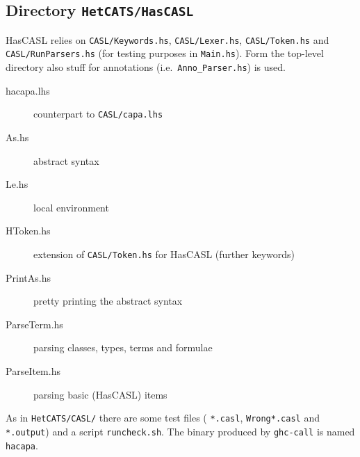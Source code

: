 \documentclass{article}
\begin{document}
\subsection{Directory \texttt{HetCATS/HasCASL}}

HasCASL relies on \texttt{CASL/Keywords.hs}, \texttt{CASL/Lexer.hs},
\texttt{CASL/Token.hs} and \texttt{CASL/RunParsers.hs} (for testing
purposes in \texttt{Main.hs}). Form the top-level directory also stuff
for annotations (i.e.\ \texttt{Anno\_Parser.hs}) is used.

\begin{description}
\item[hacapa.lhs] counterpart to \texttt{CASL/capa.lhs} 
\item[As.hs] abstract syntax
\item[Le.hs] local environment
\item[HToken.hs] extension of \texttt{CASL/Token.hs} for HasCASL
  (further keywords)
\item[PrintAs.hs] pretty printing the abstract syntax
\item[ParseTerm.hs] parsing classes, types, terms and formulae
\item[ParseItem.hs] parsing basic (HasCASL) items
\end{description}

As in \texttt{HetCATS/CASL/} there are some test files (
\texttt{*.casl}, \texttt{Wrong*.casl} and \texttt{*.output}) and a
script \texttt{runcheck.sh}. The binary produced by \texttt{ghc-call}
is named \texttt{hacapa}.
\end{document}
